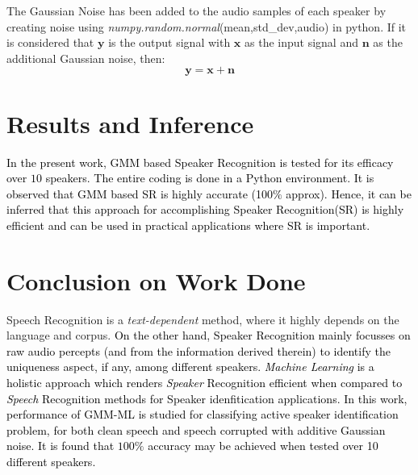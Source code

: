 \documentclass{article}
\begin{document}
The Gaussian Noise has been added to the audio samples of each speaker by creating noise using \textit{numpy.random.normal}(mean,std\_dev,audio) in python. If it is considered that $\bm y$ is the output signal with $\bm x$ as the input signal and $\bm n$ as the additional Gaussian noise, then:
\begin{equation}
\bm y = \bm x + \bm n
\end{equation} 

\section{\textbf{{Results and Inference}}} \label{result}
\textcolor{black}{In the present work, 
GMM based Speaker Recognition is tested for its efficacy over $10$ speakers. The entire coding is done in a Python environment. It is observed that GMM based SR is highly accurate (100$\%$ approx).%
Hence, it can be inferred that this approach for accomplishing Speaker Recognition(SR) is highly efficient and can be used in practical applications where SR is important.}

\section{\textbf{{Conclusion on Work Done}}}
Speech Recognition is a \textit{text-dependent} method, where it highly depends on the language and corpus. \textcolor{black}{On the other hand, Speaker Recognition mainly focusses on raw audio percepts (and from the information derived therein) %
to identify the uniqueness aspect, if any, among different speakers. \textit{Machine Learning} is a holistic approach which renders \textit{Speaker} Recognition efficient when compared to \textit{Speech} Recognition methods for Speaker idenfitication applications. %
In this work, performance of GMM-ML is studied for classifying active speaker identification problem, for both clean speech and speech corrupted with additive Gaussian noise. \textcolor{black}{It is found that $100\%$ accuracy may be achieved when tested over 10 different speakers.}}
\end{document}
